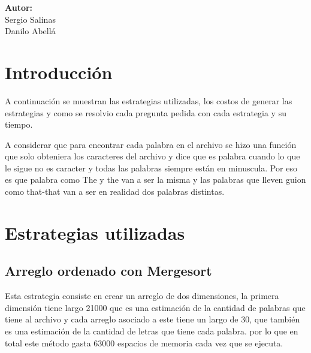 \documentclass[12pt,letterpaper]{scrartcl}
\begin{document}
\begin{titlepage}
\begin{center}
\begin{minipage}[l]{0.4\textwidth}
	\begin{flushright}

		\textbf{\textsf{Autor:}}\\
		\linespread{1}
		\large Sergio Salinas\\
		\large Danilo Abellá\\

	\end{flushright}
\end{minipage}

\end{center}

\end{titlepage}



\newpage

\tableofcontents

 \newpage
\section{Introducción} 

A continuación se muestran las estrategias utilizadas, los costos de generar las estrategias y como se resolvio cada pregunta pedida con cada estrategia y su tiempo.

A considerar que para encontrar cada palabra en el archivo se hizo una función que solo obteniera los caracteres del archivo y dice que es palabra cuando lo que le sigue no es caracter y todas las palabras siempre están en minuscula. Por eso es que palabra como The y the van a ser la misma y las palabras que lleven guion como that-that van a ser en realidad dos palabras distintas.

\newpage

\section{Estrategias utilizadas}

\subsection{Arreglo ordenado con Mergesort}

Esta estrategia consiste en crear un arreglo de dos dimensiones, la primera dimensión tiene largo 21000 que es una estimación de la cantidad de palabras que tiene al archivo y cada arreglo asociado a este tiene un largo de 30, que también es una estimación de la cantidad de letras que tiene cada palabra. por lo que en total este método gasta 63000 espacios de memoria cada vez que se ejecuta.
\end{document}
